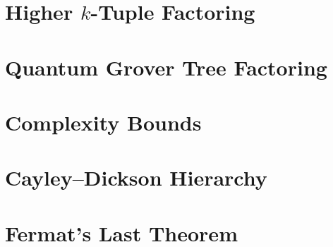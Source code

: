 

\clearpage

\section{Higher $k$-Tuple Factoring}
\label{app:06-HigherKTupleFactoring}



\clearpage

\section{Quantum Grover Tree Factoring}
\label{app:07-QuantumGroverTreeFactoring}



\clearpage

\section{Complexity Bounds}
\label{app:08-ComplexityBoundsProven}



\clearpage

\section{Cayley--Dickson Hierarchy}
\label{app:09-CayleyDicksonHierarchy}



\clearpage

\section{Fermat's Last Theorem}
\label{app:10-FermatLastTheorem}

